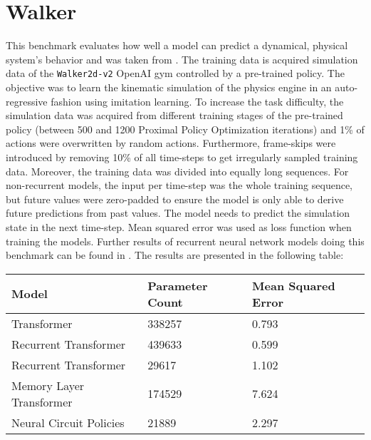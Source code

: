 \documentclass[draft,final]{vutinfth} %
\begin{document}
    \section{Walker}
    This benchmark evaluates how well a model can predict a dynamical, physical system's behavior and was taken from \cite{LongTermDependenciesIrregularTimeSeries}.
    The training data is acquired simulation data of the \texttt{Walker2d-v2} OpenAI gym \cite{OpenAIGym} controlled by a pre-trained policy.
    The objective was to learn the kinematic simulation of the physics engine in an auto-regressive fashion using imitation learning.
    To increase the task difficulty, the simulation data was acquired from different training stages of the pre-trained policy (between 500 and 1200 Proximal Policy Optimization iterations) and 1\% of actions were overwritten by random actions.
    Furthermore, frame-skips were introduced by removing 10\% of all time-steps to get irregularly sampled training data.
    Moreover, the training data was divided into equally long sequences.
    For non-recurrent models, the input per time-step was the whole training sequence, but future values were zero-padded to ensure the model is only able to derive future predictions from past values.
    The model needs to predict the simulation state in the next time-step.
    Mean squared error was used as loss function when training the models.
    Further results of recurrent neural network models doing this benchmark can be found in \cite{LatentODEsIrregularlySampled}.
    The results are presented in the following table:
    \begin{table}[h]
        \begin{tabular}{lll}
            \hline
            Model                    & Parameter Count & Mean Squared Error \\ \hline
            Transformer              & 338257          & 0.793              \\
            Recurrent Transformer    & 439633          & 0.599              \\
            Recurrent Transformer    & 29617           & 1.102              \\
            Memory Layer Transformer & 174529          & 7.624              \\
            Neural Circuit Policies  & 21889           & 2.297              \\
        \end{tabular}
    \end{table}
\end{document}
